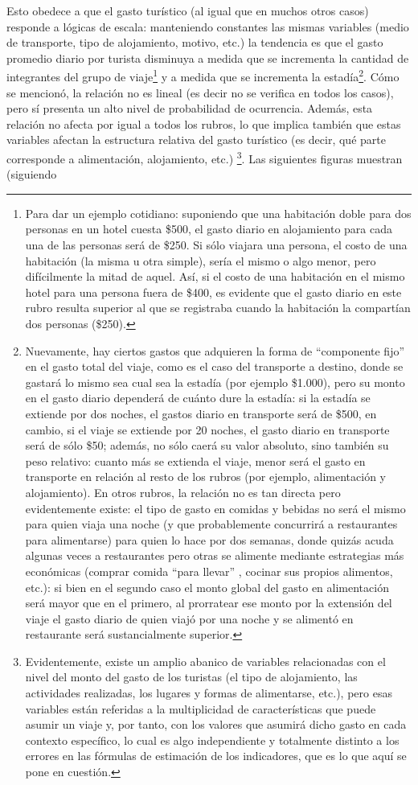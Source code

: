 \documentclass[
]{book}
\begin{document}
Esto obedece a que el gasto turístico (al igual que en muchos otros casos) responde a lógicas de escala: manteniendo constantes las mismas variables (medio de transporte, tipo de alojamiento, motivo, etc.) la tendencia es que el gasto promedio diario por turista disminuya a medida que se incrementa la cantidad de integrantes del grupo de viaje\footnote{Para dar un ejemplo cotidiano: suponiendo que una habitación doble para dos personas en un hotel cuesta \$500, el gasto diario en alojamiento para cada una de las personas será de \$250. Si sólo viajara una persona, el costo de una habitación (la misma u otra simple), sería el mismo o algo menor, pero difícilmente la mitad de aquel. Así, si el costo de una habitación en el mismo hotel para una persona fuera de \$400, es evidente que el gasto diario en este rubro resulta superior al que se registraba cuando la habitación la compartían dos personas (\$250).} y a medida que se incrementa la estadía\footnote{Nuevamente, hay ciertos gastos que adquieren la forma de ``componente fijo'' en el gasto total del viaje, como es el caso del transporte a destino, donde se gastará lo mismo sea cual sea la estadía (por ejemplo \$1.000), pero su monto en el gasto diario dependerá de cuánto dure la estadía: si la estadía se extiende por dos noches, el gastos diario en transporte será de \$500, en cambio, si el viaje se extiende por 20 noches, el gasto diario en transporte será de sólo \$50; además, no sólo caerá su valor absoluto, sino también su peso relativo: cuanto más se extienda el viaje, menor será el gasto en transporte en relación al resto de los rubros (por ejemplo, alimentación y alojamiento). En otros rubros, la relación no es tan directa pero evidentemente existe: el tipo de gasto en comidas y bebidas no será el mismo para quien viaja una noche (y que probablemente concurrirá a restaurantes para alimentarse) para quien lo hace por dos semanas, donde quizás acuda algunas veces a restaurantes pero otras se alimente mediante estrategias más económicas (comprar comida ``para llevar'' , cocinar sus propios alimentos, etc.): si bien en el segundo caso el monto global del gasto en alimentación será mayor que en el primero, al prorratear ese monto por la extensión del viaje el gasto diario de quien viajó por una noche y se alimentó en restaurante será sustancialmente superior.}. Cómo se mencionó, la relación no es lineal (es decir no se verifica en todos los casos), pero sí presenta un alto nivel de probabilidad de ocurrencia. Además, esta relación no afecta por igual a todos los rubros, lo que implica también que estas variables afectan la estructura relativa del gasto turístico (es decir, qué parte corresponde a alimentación, alojamiento, etc.) \footnote{Evidentemente, existe un amplio abanico de variables relacionadas con el nivel del monto del gasto de los turistas (el tipo de alojamiento, las actividades realizadas, los lugares y formas de alimentarse, etc.), pero esas variables están referidas a la multiplicidad de características que puede asumir un viaje y, por tanto, con los valores que asumirá dicho gasto en cada contexto específico, lo cual es algo independiente y totalmente distinto a los errores en las fórmulas de estimación de los indicadores, que es lo que aquí se pone en cuestión.}. Las siguientes figuras muestran (siguiendo 
\end{document}
